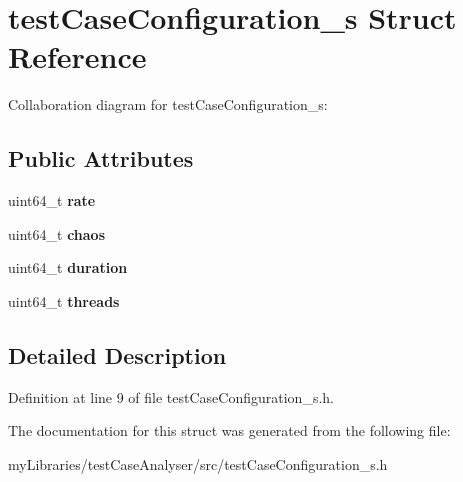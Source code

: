 \hypertarget{structtestCaseConfiguration__s}{}\section{test\+Case\+Configuration\+\_\+s Struct Reference}
\label{structtestCaseConfiguration__s}


Collaboration diagram for test\+Case\+Configuration\+\_\+s\+:
\subsection*{Public Attributes}
\begin{DoxyCompactItemize}
\item 
\mbox{\label{structtestCaseConfiguration__s_ac2290fb3c1eb4bf4c8253ebe50222f3a}} 
uint64\+\_\+t {\bfseries rate}
\item 
\mbox{\label{structtestCaseConfiguration__s_a6287a67cc7c685b5c6034f6cd25f766e}} 
uint64\+\_\+t {\bfseries chaos}
\item 
\mbox{\label{structtestCaseConfiguration__s_af6af5ca5e7f1b71abb914eb973682df7}} 
uint64\+\_\+t {\bfseries duration}
\item 
\mbox{\label{structtestCaseConfiguration__s_a7df599bdc478fe7312d07e87042f6d4f}} 
uint64\+\_\+t {\bfseries threads}
\end{DoxyCompactItemize}


\subsection{Detailed Description}


Definition at line 9 of file test\+Case\+Configuration\+\_\+s.\+h.



The documentation for this struct was generated from the following file\+:\begin{DoxyCompactItemize}
\item 
my\+Libraries/test\+Case\+Analyser/src/test\+Case\+Configuration\+\_\+s.\+h\end{DoxyCompactItemize}
